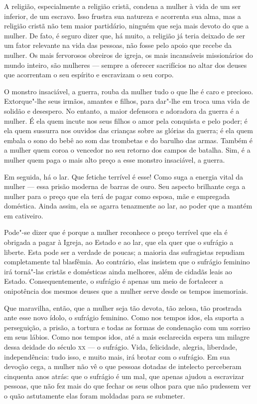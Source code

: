 A religião, especialmente a religião cristã, condena a mulher à vida de
um ser inferior, de um escravo. Isso frustra sua natureza e
acorrenta sua alma, mas a religião cristã não tem maior partidário,
ninguém que seja mais devoto do que a mulher. De fato, é seguro dizer
que, há muito, a religião já teria deixado de ser um fator relevante na vida das
pessoas, não fosse pelo apoio que recebe da mulher. Os mais fervorosos
obreiros de igreja, os mais incansáveis missionários ​​do mundo inteiro,
são mulheres --- sempre a oferecer sacrifícios no altar dos deuses que
acorrentam o seu espírito e escravizam o seu corpo.

O monstro insaciável, a guerra, rouba da mulher tudo o que lhe é caro e
precioso. Extorque"-lhe seus irmãos, amantes e filhos, para dar"-lhe em troca
uma vida de solidão e desespero. No entanto, a maior defensora e
adoradora da guerra é a mulher. É ela quem incute nos seus filhos o amor pela conquista e pelo poder; é ela quem sussurra nos ouvidos das crianças sobre as glórias da guerra; é ela quem embala o sono do bebê ao som das
trombetas e do barulho das armas. Também é a mulher quem coroa o vencedor no
seu retorno dos campos de batalha. Sim, é a mulher quem paga o mais alto
preço a esse monstro insaciável, a guerra.

Em seguida, há o lar. Que fetiche terrível é esse! Como suga a energia
vital da mulher --- essa prisão moderna de barras de ouro. Seu aspecto
brilhante cega a mulher para o preço que ela terá de pagar como esposa,
mãe e empregada doméstica. Ainda assim, ela se agarra tenazmente ao lar,
ao poder que a mantém em cativeiro.

Pode"-se dizer que é porque a mulher reconhece o preço terrível que ela é
obrigada a pagar à Igreja, ao Estado e ao lar, que ela quer que o
sufrágio a liberte. Esta pode ser a verdade de poucas; a maioria das
sufragistas repudiam completamente tal blasfêmia. Ao contrário, elas
insistem que o sufrágio feminino irá torná"-las cristãs e domésticas
ainda melhores, além de cidadãs leais ao Estado. Consequentemente, o
sufrágio é apenas um meio de fortalecer a onipotência dos mesmos deuses
que a mulher serve desde os tempos imemoriais.

Que maravilha, então, que a mulher seja tão devota, tão zelosa, tão
prostrada ante esse novo ídolo, o sufrágio feminino. Como nos tempos
idos, ela suporta a perseguição, a prisão, a tortura e todas as formas
de condenação com um sorriso em seus lábios. Como nos tempos idos, até a
mais esclarecida espera um milagre dessa deidade do século \textsc{xx} --- o
sufrágio. Vida, felicidade, alegria, liberdade, independência: tudo
isso, e muito mais, irá brotar com o sufrágio. Em sua devoção cega, a
mulher não vê o que pessoas dotadas de intelecto perceberam cinquenta
anos atrás: que o sufrágio é um mal, que apenas ajudou a escravizar
pessoas, que não fez mais do que fechar os seus olhos para que não
pudessem ver o quão astutamente elas foram moldadas para se submeter.


